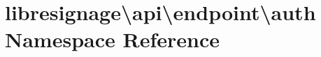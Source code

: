 \hypertarget{namespacelibresignage_1_1api_1_1endpoint_1_1auth}{}\section{libresignage\textbackslash{}api\textbackslash{}endpoint\textbackslash{}auth Namespace Reference}
\label{namespacelibresignage_1_1api_1_1endpoint_1_1auth}
